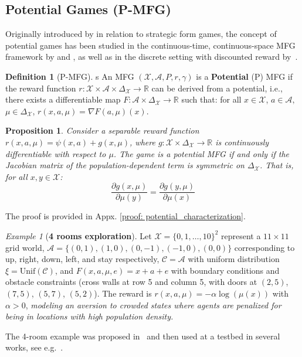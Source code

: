 \documentclass[10pt,twocolumn,letterpaper]{article}
\newtheorem{proposition}[theorem]{Proposition}
\theoremstyle{definition}
\newtheorem{definition}[theorem]{Definition}
\theoremstyle{remark}
\newtheorem{example}{Example}
\newcommand{\states}{\mathcal{X}}
\newcommand{\actions}{\mathcal{A}}
\newcommand{\R}{\mathbb{R}}
\newcommand{\noises}{\mathcal{C}}
\newcommand{\unif}{\mathrm{Unif}}
\begin{document}
\subsection{Potential Games  (P-MFG)}
Originally introduced by \citet{monderer1996potential} in relation to strategic form games, the concept of potential games has been studied in the continuous-time, continuous-space MFG framework by \citet{MR2295621} and \citet{cardaliaguet2017learning}, as well as in the discrete setting with discounted reward by~\citet{geist2022concave}.
\begin{mdframed}[
    linewidth=0pt,        %
    roundcorner=5pt,        %
    backgroundcolor=blue!5, 
    innertopmargin=2pt, 
    innerbottommargin=2pt
]
\begin{definition}[P-MFG]
\label{def: potential_game}
s    An MFG $(\mathcal X, \mathcal A,P, r, \gamma)$ is a \textbf{Potential} (P) MFG if the reward function $r:\mathcal X \times \mathcal A \times \Delta_{\mathcal X}\to \R$ can be derived from a potential, i.e., there exists a differentiable map $F: \mathcal A \times \Delta_{\mathcal X}\to \mathbb R$ such that: for all  $x \in \mathcal X$, $a \in \mathcal A,$ $\mu \in \Delta_{\mathcal X}$, $r(x, a, \mu) = \nabla F(a, \mu)(x)$. 
\end{definition}
\end{mdframed}
\begin{proposition}%
\label{prop: potential_characterization}
    Consider a separable reward function $r(x, a, \mu) = \psi(x, a) + g(x, \mu)$, where $g: \states \times \Delta_{\states} \to \mathbb R$ is continuously differentiable with respect to $\mu$. The game is a potential MFG if and only if the Jacobian matrix of the population-dependent term is symmetric on $\Delta_{\states}$. That is, for all $x, y \in \states$:
    \[
        \frac{\partial g(x, \mu)}{\partial \mu(y)} = \frac{\partial g(y, \mu)}{\partial \mu(x)}
    \]
\end{proposition}
The proof is provided in Appx. \ref{proof: potential_characterization}. 
\begin{example}[\textbf{4 rooms exploration}]
    \label{ex:P-MFG1}
    Let $\states = \{0, 1, \ldots, 10\}^2$ represent a $11 \times 11$ grid world, $\actions = \{(0,1), (1,0), (0, -1), (-1, 0), (0,0)\}$ corresponding to up, right, down, left, and stay respectively, $\noises = \actions $ with uniform distribution $\xi = \unif(\noises)$, and $F(x, a, \mu, e) = x + a + e$ with boundary conditions and obstacle constraints (cross walls at row 5 and column 5, with doors at $(2,5)$, $(7,5)$, $(5,7)$, $(5,2)$). The reward is $r(x, a, \mu) = -\alpha \log(\mu(x))$ with $\alpha > 0$, \textit{modeling an aversion to crowded states where agents are penalized for being in locations with high population density.}
\end{example}
The 4-room example was proposed in~\cite{geist2022concave} and then used at a testbed in several works, see e.g.~\citep{algumaei2023regularization}.
\end{document}
